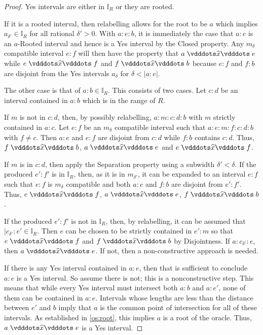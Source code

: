 \documentclass[12pt]{article}
\begin{document}
\begin{proof}
    Yes intervals are either in $\mathbb{I}_R$ or they are rooted. 
    
    If it is a rooted interval, then relabelling allows for the root to be $a$ which implies $a_{\delta'} \in \mathbb{I}_R$ for all rational $\delta' >0$. With $a:e:b$, it is immediately the case that $a:e$ is an $a$-Rooted interval and hence is a Yes interval by the Closed property. Any $m_\delta$ compatible interval $e:f$ will then have the property that $a \xora e$ while \sout{$e\xora f$} and \sout{$f\xora b$} because $e:f$ and $f:b$ are disjoint from the Yes intervals $a_\delta$ for $\delta < |a:e|$.
 
    The other case is that of $a:b \in \mathbb{I}_R$. This consists of two cases. Let $c:d$ be an interval contained in $a:b$ which is in the range of $R$. 
    
    If $m$ is not in $c:d$, then, by possibly relabelling, $a:m:c:d:b$ with $m$ strictly contained in $a:c$.  Let $e:f$ be an $m_\delta$ compatible interval such that $a:e:m:f:c:d:b$ with $f \neq c$. Then $a:e$ and $e:f$ are disjoint from $c:d$ while $f:b$ contains $c:d$. Thus, $f \xora b$, \sout{$a\xora e$} and \sout{$e\xora f$}.

    If $m$ is in $c:d$, then apply the Separation property using a subwidth $\delta' < \delta$. If the produced $e':f'$ is in $\mathbb{I}_R$, then, as it is in $m_{\delta'}$, it can be expanded to an interval $e:f$ such that $e:f$ is $m_\delta$ compatible and both $a:e$ and $f:b$ are disjoint from $e':f'$. Thus, $e \xora f$, \sout{$a\xora e$}, \sout{$f\xora b$}.

    If the produced $e':f'$ is not in $\mathbb{I}_R$, then, by relabelling, it can be assumed that $|c_{\delta'}:e' \in \mathbb{I}_R$. Then $e$ can be chosen to be strictly contained in $e':m$ so that \sout{$e\xora f$} and \sout{$f\xora b$} by Disjointness. If $a:c_{\delta'}:e$, then $a \xora e$. If not, then a non-constructive approach is needed.

    If there is any Yes interval contained in $a:e$, then that is sufficient to conclude $a:e$ is a Yes interval. So assume there is not; this is a nonconstructive step. This means that while every Yes interval must intersect both $a:b$ and $a:e'$, none of them can be contained in $a:e$. Intervals whose lengths are less than the distance between $e'$ and $b$ imply that $a$ is the common point of intersection for all of these intervals. As established in \ref{os:root}, this implies $a$ is a root of the oracle. Thus, $a \xora e$ is a Yes interval. 

\end{proof}
\end{document}
